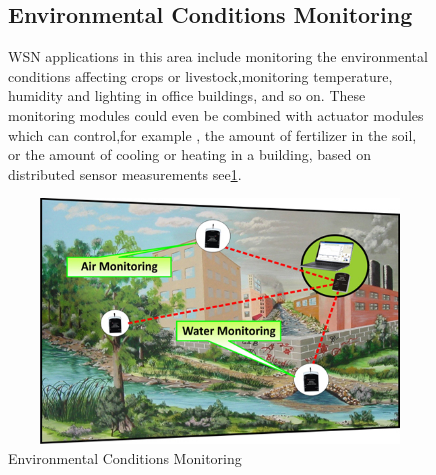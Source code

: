	\begin{figure}
	\subsection{Environmental Conditions Monitoring}
		 WSN applications in this area include monitoring the environmental conditions affecting crops or livestock,monitoring  temperature,  humidity  and lighting  in  office buildings, and so on. These monitoring modules could even be  combined  with  actuator modules which can control,for example , the amount of fertilizer in the soil, or the amount of cooling or heating in a building, based on distributed sensor measurements\cite{application} see\ref{fig:x Environmental_Conditions_Monitoring}.

	

	
	\hfill
	\includegraphics[scale=0.5,width=12cm,height=6.5cm]{photos/env.jpg}
	\caption{Environmental Conditions Monitoring}
		\centering
	\label{fig:x Environmental_Conditions_Monitoring}
	\hspace*{\fill}
 	\end{figure}

